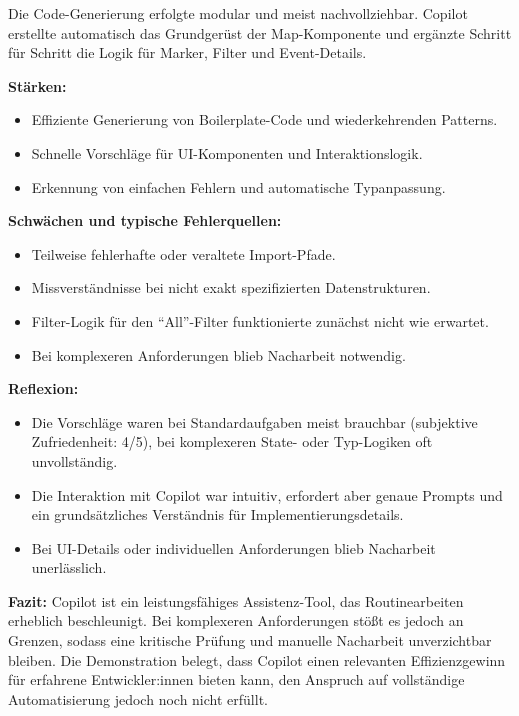 Die Code-Generierung erfolgte modular und meist nachvollziehbar. Copilot
erstellte automatisch das Grundgerüst der Map-Komponente und ergänzte Schritt
für Schritt die Logik für Marker, Filter und Event-Details.

\textbf{Stärken:}
\begin{itemize}
      \item Effiziente Generierung von Boilerplate-Code und wiederkehrenden Patterns.
      \item Schnelle Vorschläge für UI-Komponenten und Interaktionslogik.
      \item Erkennung von einfachen Fehlern und automatische Typanpassung.
\end{itemize}

\textbf{Schwächen und typische Fehlerquellen:}
\begin{itemize}
      \item Teilweise fehlerhafte oder veraltete Import-Pfade.
      \item Missverständnisse bei nicht exakt spezifizierten Datenstrukturen.
      \item Filter-Logik für den ``All''-Filter funktionierte zunächst nicht wie erwartet.
      \item Bei komplexeren Anforderungen blieb Nacharbeit notwendig.
\end{itemize}

\textbf{Reflexion:}
\begin{itemize}
      \item Die Vorschläge waren bei Standardaufgaben meist brauchbar (subjektive
            Zufriedenheit: 4/5), bei komplexeren State- oder Typ-Logiken oft unvollständig.
      \item Die Interaktion mit Copilot war intuitiv, erfordert aber genaue Prompts und ein
            grundsätzliches Verständnis für Implementierungsdetails.
      \item Bei UI-Details oder individuellen Anforderungen blieb Nacharbeit unerlässlich.
\end{itemize}

\textbf{Fazit:}
Copilot ist ein leistungsfähiges Assistenz-Tool, das Routinearbeiten erheblich beschleunigt. Bei komplexeren Anforderungen stößt es jedoch an Grenzen, sodass eine kritische Prüfung und manuelle Nacharbeit unverzichtbar bleiben. Die Demonstration belegt, dass Copilot einen relevanten Effizienzgewinn für erfahrene Entwickler:innen bieten kann, den Anspruch auf vollständige Automatisierung jedoch noch nicht erfüllt.


